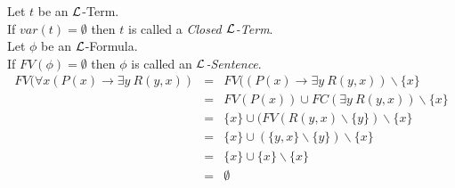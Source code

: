 \documentclass[11pt,a4paper]{article}
\begin{document}
Let $t$ be an $\mathcal{L}$-Term.\\
If $var(t)=\emptyset$ then $t$ is called a \textit{Closed $\mathcal{L}$-Term}.\\

Let $\phi$ be an $\mathcal{L}$-Formula.\\
If $FV(\phi)=\emptyset$ then $\phi$ is called an \textit{$\mathcal{L}$-Sentence}.\\

\[\begin{array}{rcl}
FV(\forall x(P(x)\to\exists y\ R(y,x))&=&FV((P(x)\to\exists y\ R(y,x))\backslash\{x\}\\
&=&FV(P(x))\cup FC(\exists y\ R(y,x))\backslash\{x\}\\
&=&\{x\}\cup(FV(R(y,x)\backslash\{y\})\backslash\{x\}\\
&=&\{x\}\cup(\{y,x\}\backslash\{y\})\backslash\{x\}\\
&=&\{x\}\cup\{x\}\backslash\{x\}\\
&=&\emptyset
\end{array}\]

\end{document}

